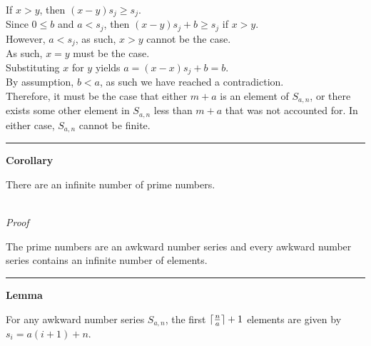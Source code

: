 \documentclass[a4paper,12pt]{article}
\DeclarePairedDelimiter{\ceil}{\lceil}{\rceil}
\begin{document}
\noindent If $x > y$, then $(x - y)s_j \geq s_j$.\\

\noindent Since $0 \leq b$ and $a < s_j$, then $(x - y)s_j + b \geq s_j$ if $x > y$.\\

\noindent However, $a < s_j$, as such, $x > y$ cannot be the case.\\

\noindent As such, $x = y$ must be the case.\\

\noindent Substituting $x$ for $y$ yields $a = (x - x)s_j + b = b$.\\

\noindent By assumption, $b < a$, as such we have reached a contradiction.\\

\noindent Therefore, it must be the case that either $m + a$ is an element of $S_{a,n}$, or there exists some other element in $S_{a,n}$ less than $m + a$ that was not accounted for. In either case, $S_{a,n}$ cannot be finite.

\begin{center}
\noindent\rule{8cm}{0.4pt}
\end{center}







\label{corollary:infinite_primes}
\hypertarget{corollary:infinite_primes}{}
\begin{tcolorbox}
\textbf{Corollary}

There are an infinite number of prime numbers.
\end{tcolorbox}

\noindent \\
\textit{Proof}

\noindent The prime numbers are an awkward number series and every awkward number series contains an infinite number of elements.

\begin{center}
\noindent\rule{8cm}{0.4pt}
\end{center}




\label{lemma:initial_staples}
\hypertarget{lemma:initial_staples}{}
\begin{tcolorbox}
\textbf{Lemma}

For any awkward number series $S_{a,n}$, the first $\ceil{\frac{n}{a}} + 1$ elements are given by $s_i = a(i + 1) + n$.
\end{tcolorbox}
\end{document}
